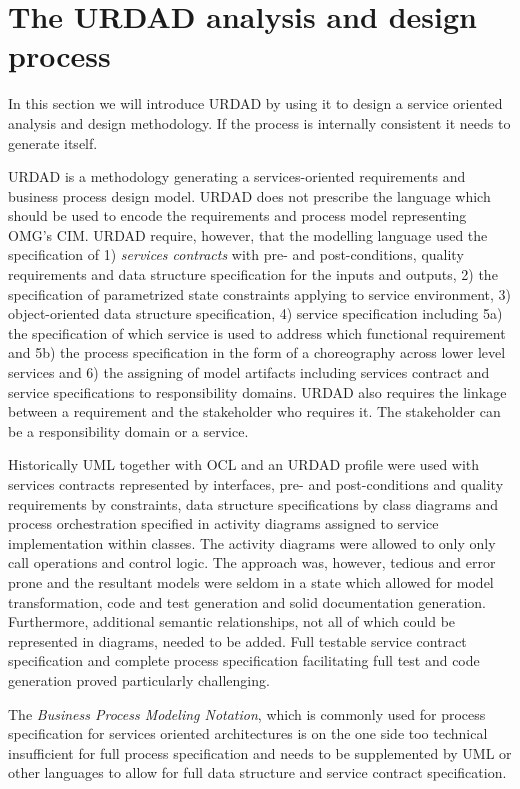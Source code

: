 \section{The URDAD analysis and design process}

In this section we will introduce URDAD by using it to design a service oriented analysis and design methodology. If the process is internally consistent it needs to generate itself. 

URDAD is a methodology generating a services-oriented requirements and business process design model. URDAD does not prescribe the language which should be used to encode the requirements and process model representing OMG's CIM. URDAD require, however, that the modelling language used the specification of 1) \emph{services contracts} with pre- and post-conditions, quality requirements and data structure specification for the inputs and outputs, 2) the specification of parametrized state constraints applying to service environment, 3) object-oriented data structure specification, 4) service specification including 5a) the specification of which service is used to address which functional requirement and 5b) the process specification in the form of a choreography across lower level services and 6) the assigning of model artifacts including services contract and service specifications to responsibility domains. URDAD also requires the linkage between a requirement and the stakeholder who requires it. The stakeholder can be a responsibility domain or a service.

Historically UML together with OCL and an URDAD profile were used with services contracts represented by interfaces, pre- and post-conditions and quality requirements by constraints, data structure specifications by class diagrams and process orchestration specified in activity diagrams assigned to service implementation within classes. The activity diagrams were allowed to only only call operations and control logic. The approach was, however, tedious and error prone and the resultant models were seldom in a state which allowed for model transformation, code and test generation and solid documentation generation. Furthermore, additional semantic relationships, not all of which could be represented in diagrams, needed to be added. Full testable service contract specification and complete process specification facilitating full test and code generation proved particularly challenging.

The \emph{Business Process Modeling Notation}, which is commonly used for process specification for services oriented architectures is on the one side too technical \cite{} insufficient for full process specification and needs to be supplemented by UML or other languages to allow for full data structure and service contract specification.

